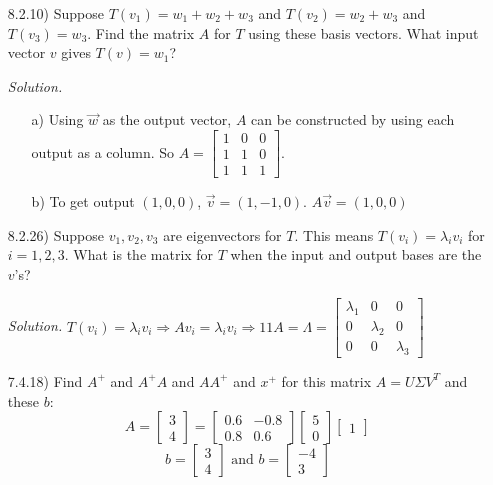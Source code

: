 \documentclass[12pt,pdftex]{article}
\begin{document}
\begin{itemize}
\item[8.2.10)] Suppose $T(v_1)=w_1+w_2+w_3$ and $T(v_2)=w_2+w_3$ and $T(v_3)=w_3$. Find the matrix $A$ for $T$ using these basis vectors. What input vector $v$ gives $T(v)=w_1$?

\textit{Solution.}
\begin{itemize}
\item[a)] Using $\vec{w}$ as the output vector, $A$ can be constructed by using each output as a column. So 
			$A=\begin{bmatrix}
			1 & 0 & 0 \\ 1 & 1 & 0 \\ 1 & 1 & 1
			\end{bmatrix}$.
\item[b)] To get output $(1,0,0)$, $\vec{v}=(1,-1,0)$. $A\vec{v}=(1,0,0)$
\end{itemize}

\item[8.2.26)] Suppose $v_1,v_2,v_3$ are eigenvectors for $T$. This means $T(v_i)=\lambda_iv_i$ for $i=1,2,3$. What is the matrix for $T$ when the input and output bases are the $v$'s?

\textit{Solution.} 
$T(v_i)=\lambda_iv_i \Rightarrow Av_i=\lambda_iv_i \Rightarrow 11A=\Lambda= \begin{bmatrix}
\lambda_1 & 0 & 0 \\ 0 & \lambda_2 & 0 \\ 0 & 0 & \lambda_3
\end{bmatrix}$

\item[7.4.18)] Find $A^+$ and $A^+A$ and $AA^+$ and $x^+$ for this matrix $A=U\Sigma V^T$ and these $b$:
\[A=\begin{bmatrix}
3 \\ 4
\end{bmatrix}=\begin{bmatrix}
0.6 & -0.8 \\ 0.8 & 0.6
\end{bmatrix}\begin{bmatrix}
5 \\ 0
\end{bmatrix}\begin{bmatrix}
1
\end{bmatrix}\]
\[b=\begin{bmatrix}
3 \\ 4
\end{bmatrix} \text{ and } b= \begin{bmatrix}
-4 \\ 3
\end{bmatrix}\]


\end{itemize}
\end{document}
